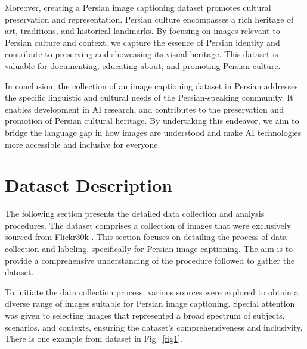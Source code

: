 \documentclass[runningheads]{llncs}
\begin{document}
Moreover, creating a Persian image captioning dataset promotes cultural preservation and representation. Persian culture encompasses a rich heritage of art, traditions, and historical landmarks. By focusing on images relevant to Persian culture and context, we capture the essence of Persian identity and contribute to preserving and showcasing its visual heritage. This dataset is valuable for documenting, educating about, and promoting Persian culture.

In conclusion, the collection of an image captioning dataset in Persian addresses the specific linguistic and cultural needs of the Persian-speaking community. It enables development in AI research, and contributes to the preservation and promotion of Persian cultural heritage. By undertaking this endeavor, we aim to bridge the language gap in how images are understood and make AI technologies more accessible and inclusive for everyone.

\section{Dataset Description}
The following section presents the detailed data collection and analysis procedures. The dataset comprises a collection of images that were exclusively sourced from Flickr30k \cite{Flickr30k}. This section focuses on detailing the process of data collection and labeling, specifically for Persian image captioning. The aim is to provide a comprehensive understanding of the procedure followed to gather the dataset.

To initiate the data collection process, various sources were explored to obtain a diverse range of images suitable for Persian image captioning. Special attention was given to selecting images that represented a broad spectrum of subjects, scenarios, and contexts, ensuring the dataset's comprehensiveness and inclusivity. There is one example from dataset in  Fig.~\ref{fig1}. 
\end{document}
